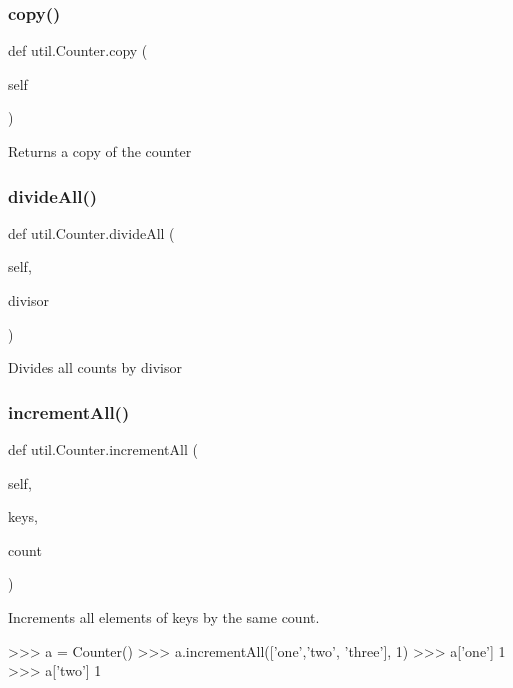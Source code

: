 \subsubsection{\texorpdfstring{copy()}{copy()}}
{\footnotesize\ttfamily def util.\+Counter.\+copy (\begin{DoxyParamCaption}\item[{}]{self }\end{DoxyParamCaption})}

\begin{DoxyVerb}Returns a copy of the counter
\end{DoxyVerb}
 \mbox{\label{classutil_1_1_counter_a510574fa4c36d2d4c845b9f6ac5bc155}} 
\subsubsection{\texorpdfstring{divide\+All()}{divideAll()}}
{\footnotesize\ttfamily def util.\+Counter.\+divide\+All (\begin{DoxyParamCaption}\item[{}]{self,  }\item[{}]{divisor }\end{DoxyParamCaption})}

\begin{DoxyVerb}Divides all counts by divisor
\end{DoxyVerb}
 \mbox{\label{classutil_1_1_counter_a92c9ebbb536e6febb2b2856f30f21804}} 
\subsubsection{\texorpdfstring{increment\+All()}{incrementAll()}}
{\footnotesize\ttfamily def util.\+Counter.\+increment\+All (\begin{DoxyParamCaption}\item[{}]{self,  }\item[{}]{keys,  }\item[{}]{count }\end{DoxyParamCaption})}

\begin{DoxyVerb}Increments all elements of keys by the same count.

>>> a = Counter()
>>> a.incrementAll(['one','two', 'three'], 1)
>>> a['one']
1
>>> a['two']
1
\end{DoxyVerb}
 \mbox{\label{classutil_1_1_counter_a5d3243989dde93af492d2a7618ea322f}} 
